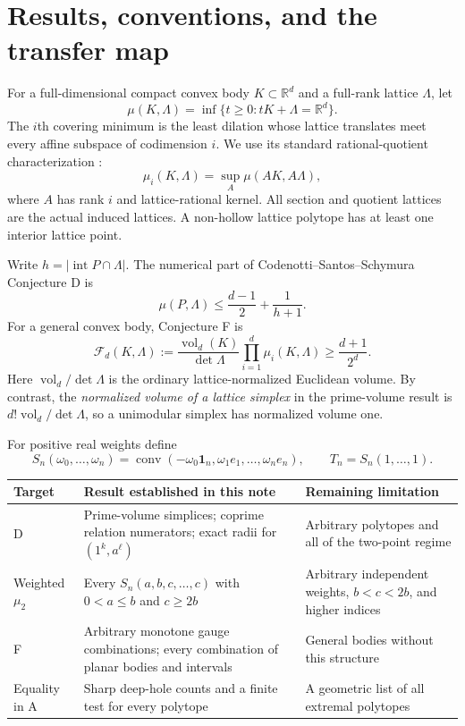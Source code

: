 \documentclass[11pt,a4paper]{article}
\theoremstyle{remark}\newtheorem{remark}[theorem]{Remark}
\newcommand{\R}{\mathbb R}\newcommand{\Z}{\mathbb Z}
\begin{document}
\section{Results, conventions, and the transfer map}

For a full-dimensional compact convex body $K\subset\R^d$ and a
full-rank lattice $\Lambda$, let
\[
 \mu(K,\Lambda)=\inf\{t\ge0:tK+\Lambda=\R^d\}.
\]
The $i$th covering minimum is the least dilation whose lattice
translates meet every affine subspace of codimension $i$. We use
its standard rational-quotient characterization \cite{CSS,Krivokuca}:
\[
 \mu_i(K,\Lambda)=\sup_A\mu(AK,A\Lambda),
\]
where $A$ has rank $i$ and lattice-rational kernel. All section and
quotient lattices are the actual induced lattices. A non-hollow
lattice polytope has at least one interior lattice point.

Write $h=|\operatorname{int}P\cap\Lambda|$. The numerical part of
Codenotti--Santos--Schymura Conjecture D is \cite{CSS}
\begin{equation}\label{intro:D}
 \mu(P,\Lambda)\le\frac{d-1}{2}+\frac1{h+1}.
\end{equation}
For a general convex body, Conjecture F is \cite{GMS,CSS}
\begin{equation}\label{intro:F}
 \mathcal F_d(K,\Lambda):=
 \frac{\operatorname{vol}_d(K)}{\det\Lambda}
       \prod_{i=1}^{d}\mu_i(K,\Lambda)
 \ge\frac{d+1}{2^d}.
\end{equation}
Here $\operatorname{vol}_d/\det\Lambda$ is the ordinary
lattice-normalized Euclidean volume. By contrast, the
\emph{normalized volume of a lattice simplex} in the prime-volume
result is $d!\operatorname{vol}_d/\det\Lambda$, so a unimodular
simplex has normalized volume one.

For positive real weights define
\[
 S_n(\omega_0,\ldots,\omega_n)=
 \operatorname{conv}(-\omega_0\mathbf1_n,\omega_1e_1,\ldots,\omega_ne_n),
 \qquad T_n=S_n(1,\ldots,1).
\]

\begin{center}\small
\begin{tabularx}{\linewidth}{@{}>{\raggedright\arraybackslash}p{.15\linewidth}
 >{\raggedright\arraybackslash}X >{\raggedright\arraybackslash}X@{}}
\toprule
Target & Result established in this note & Remaining limitation\\
\midrule
D & Prime-volume simplices; coprime relation numerators; exact radii for
$(1^k,a^\ell)$ & Arbitrary polytopes and all of the two-point regime\\
Weighted $\mu_2$ & Every $S_n(a,b,c,\ldots,c)$ with $0<a\le b$ and $c\ge2b$ &
Arbitrary independent weights, $b<c<2b$, and higher indices\\
F & Arbitrary monotone gauge combinations; every combination of planar
bodies and intervals & General bodies without this structure\\
Equality in A & Sharp deep-hole counts and a finite test for every polytope &
A geometric list of all extremal polytopes\\
\bottomrule
\end{tabularx}
\end{center}
\end{document}
